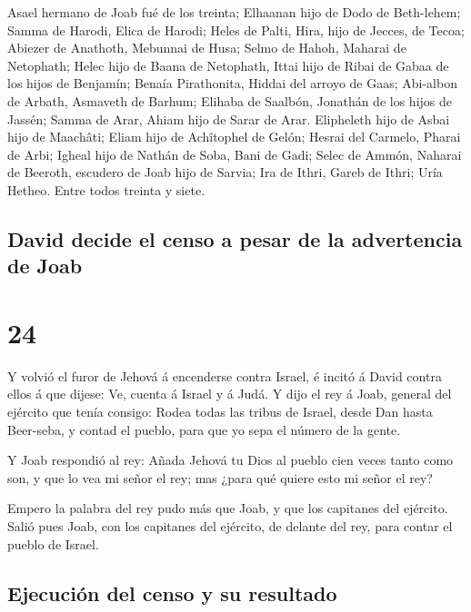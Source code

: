  Asael hermano de Joab fué de los treinta; Elhaanan hijo de
Dodo de Beth-lehem;  Samma de Harodi, Elica de Harodi;
 Heles de Palti, Hira, hijo de Jecces, de Tecoa;
 Abiezer de Anathoth, Mebunnai de Husa;  Selmo
de Hahoh, Maharai de Netophath;  Helec hijo de Baana de
Netophath, Ittai hijo de Ribai de Gabaa de los hijos de Benjamín;
 Benaía Pirathonita, Hiddai del arroyo de Gaas;
 Abi-albon de Arbath, Asmaveth de Barhum; 
Elihaba de Saalbón, Jonathán de los hijos de Jassén;  Samma
de Arar, Ahiam hijo de Sarar de Arar.  Elipheleth hijo de
Asbai hijo de Maachâti; Eliam hijo de Achîtophel de Gelón; 
Hesrai del Carmelo, Pharai de Arbi;  Igheal hijo de Nathán
de Soba, Bani de Gadi;  Selec de Ammón, Naharai de Beeroth,
escudero de Joab hijo de Sarvia;  Ira de Ithri, Gareb de
Ithri;  Uría Hetheo. Entre todos treinta y siete.

\hypertarget{david-decide-el-censo-a-pesar-de-la-advertencia-de-joab}{%
\subsection{David decide el censo a pesar de la advertencia de
Joab}\label{david-decide-el-censo-a-pesar-de-la-advertencia-de-joab}}

\hypertarget{section-23}{%
\section{24}\label{section-23}}

 Y volvió el furor de Jehová á encenderse contra Israel, é
incitó á David contra ellos á que dijese: Ve, cuenta á Israel y á Judá.
 Y dijo el rey á Joab, general del ejército que tenía
consigo: Rodea todas las tribus de Israel, desde Dan hasta Beer-seba, y
contad el pueblo, para que yo sepa el número de la gente.

 Y Joab respondió al rey: Añada Jehová tu Dios al pueblo
cien veces tanto como son, y que lo vea mi señor el rey; mas ¿para qué
quiere esto mi señor el rey?

 Empero la palabra del rey pudo más que Joab, y que los
capitanes del ejército. Salió pues Joab, con los capitanes del ejército,
de delante del rey, para contar el pueblo de Israel.

\hypertarget{ejecuciuxf3n-del-censo-y-su-resultado}{%
\subsection{Ejecución del censo y su
resultado}\label{ejecuciuxf3n-del-censo-y-su-resultado}}

